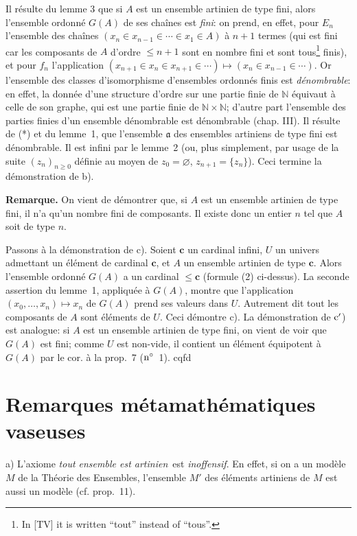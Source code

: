 \documentclass[12pt]{article}
\newcommand{\nn}{\noindent}
\newcommand{\NN}{\mathbb N}
\begin{document}
Il résulte du lemme 3 que si $A$ est un ensemble artinien de type fini, alors l'ensemble ordonné $G(A)$ de ses chaînes est \emph{fini}: on prend, en effet, pour $E_n$ l'ensemble des chaînes $(x_n\in x_{n-1} \in \cdots \in x_1\in A)$ à $n+1$ termes (qui est fini car les composants de $A$ d'ordre $\leq n+1$ sont en nombre fini et sont tous\footnote{In [TV] it is written ``tout'' instead of ``tous''.} finis), et pour $f_n$ l'application $(x_{n+1}\in x_n \in x_{n+1} \in \cdots)\mapsto (x_n\in x_{n-1}\in\cdots)$. Or l'ensemble des classes d'isomorphisme d'ensembles ordonnés finis est \emph{dénombrable}: en effet, la donnée d'une structure d'ordre sur une partie finie de $\NN$ équivaut à celle de son graphe, qui est une partie finie de $\NN \times \NN$; d'autre part l'ensemble des parties finies d'un ensemble dénombrable est dénombrable (chap. III). Il résulte de (*) et du lemme~1, que l'ensemble $\mathfrak{a}$ des ensembles artiniens de type fini est dénombrable. Il est infini par le lemme~2 (ou, plus simplement, par usage de la suite $(z_n)_{n\geq 0} $ définie au moyen de $z_0=\varnothing$, $z_{n+1}=\{z_n\}$). Ceci termine la démonstration de b).

\nn\textbf{Remarque.} On vient de démontrer que, si $A$ est un ensemble artinien de type fini, il n'a qu'un nombre fini de composants. Il existe donc un entier $n$ tel que $A$ soit de type $n$.

Passons à la démonstration de c). Soient $\mathbf c$ un cardinal infini, $U$ un univers admettant un élément de cardinal $\mathbf c$, et $A$ un ensemble artinien de type $\mathbf c$. Alors l'ensemble ordonné $G(A)$ a un cardinal $\leq \mathbf c$ (formule (2) ci-dessus). La seconde assertion du lemme~1, appliquée à $G(A)$, montre que l'application $(x_0,\ldots, x_n)\mapsto x_n$ de $G(A)$ prend ses valeurs dans $U$. Autrement dit tout les composants de $A$ sont éléments de $U$. Ceci démontre c). La démonstration de $\rm c'$) est analogue: si $A$ est un ensemble artinien de type fini, on vient de voir que $G(A)$ est fini; comme $U$ est non-vide, il contient un élément équipotent à $G(A)$ par le cor. à la prop.~7 ($\rm n^\circ$~1). cqfd

\section{Remarques métamathématiques vaseuses}

\nn a) L'axiome \og\emph{tout ensemble est artinien}\fg\ est \emph{inoffensif}. En effet, si on a un modèle $M$ de la Théorie des Ensembles, l'ensemble $M'$ des éléments artiniens de $M$ est aussi un modèle (cf. prop.~11).
\end{document}
